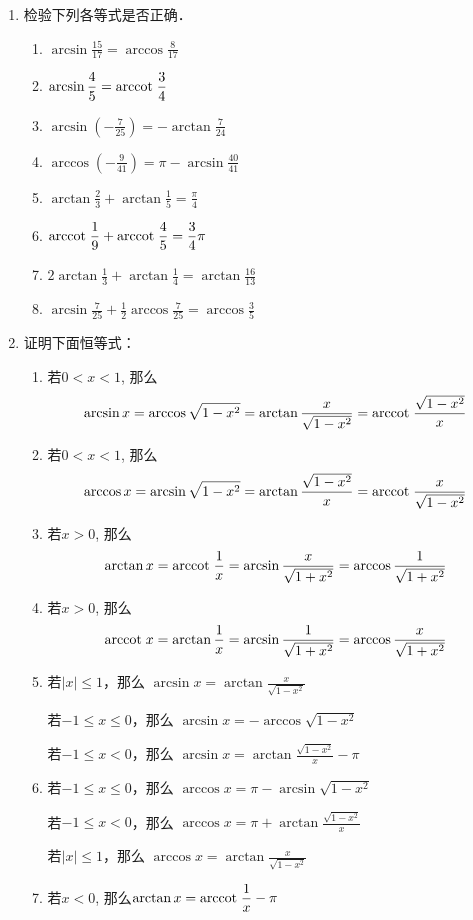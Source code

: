 \begin{enumerate}
\item 检验下列各等式是否正确．
 \begin{enumerate}
\item $\arcsin \frac{15}{17}=\arccos \frac{8}{17}$
\item $\arcsin \dfrac{4}{5}={\rm arccot\; }\dfrac{3}{4}$
\item $\arcsin \left(-\frac{7}{25}\right)=-\arctan \frac{7}{24}$
\item $\arccos \left(-\frac{9}{41}\right)=\pi-\arcsin \frac{40}{41}$
\item  $\arctan \frac{2}{3}+\arctan \frac{1}{5}=\frac{\pi}{4}$
\item ${\rm arccot\; }\dfrac{1}{9}+{\rm arccot\; }\dfrac{4}{5}=\dfrac{3}{4} \pi$
\item  $2 \arctan \frac{1}{3}+\arctan \frac{1}{4}=\arctan \frac{16}{13}$
\item $\arcsin \frac{7}{25}+\frac{1}{2} \arccos \frac{7}{25}=\arccos \frac{3}{5}$
\end{enumerate}   

\item 证明下面恒等式：
\begin{enumerate}
    \item 若$0<x<1$, 那么
\[\arcsin x=\arccos\sqrt{1-x^2}=\arctan\dfrac{x}{\sqrt{1-x^2}}={\rm arccot\; }\dfrac{\sqrt{1-x^2}}{x}\]
    \item 若$0<x<1$, 那么
    \[\arccos x=\arcsin\sqrt{1-x^2}=\arctan\dfrac{\sqrt{1-x^2}}{x}={\rm arccot\; }\dfrac{x}{\sqrt{1-x^2}}\]
    \item 若$x>0$, 那么
  \[\arctan x={\rm arccot\; } \dfrac{1}{x}=\arcsin\dfrac{x}{\sqrt{1+x^2}}=\arccos\dfrac{1}{\sqrt{1+x^2}}\]
  \item 若$x>0$, 那么
  \[{\rm arccot\; } x=\arctan \dfrac{1}{x}=\arcsin\dfrac{1}{\sqrt{1+x^2}}=\arccos\dfrac{x}{\sqrt{1+x^2}}\]
  \item 若$|x|\le 1$，那么 $\arcsin x=\arctan\frac{x}{\sqrt{1-x^2}}$
  
  若$-1\le x\le 0$，那么 $\arcsin x=-\arccos{\sqrt{1-x^2}}$

  若$-1\le x< 0$，那么 $\arcsin x=\arctan\frac{\sqrt{1-x^2}}{x}-\pi$

\item 若$-1\le x\le 0$，那么 $\arccos x=\pi-\arcsin{\sqrt{1-x^2}}$

若$-1\le x< 0$，那么 $\arccos x=\pi+\arctan\frac{\sqrt{1-x^2}}{x}$

若$|x|\le 1$，那么 $\arccos x=\arctan\frac{x}{\sqrt{1-x^2}}$

\item 若$x<0$, 那么$\arctan x={\rm arccot\; } \dfrac{1}{x}-\pi$


\end{enumerate}
\end{enumerate}

